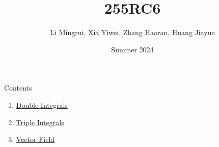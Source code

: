 \documentclass[aspectratio=169, UTF8]{ctexbeamer}
\title{\LARGE 255RC6}
\author{ Li Mingrui, Xia Yiwei, Zhang Haoran, Huang Jiayue}
\date{Summer 2024}
\begin{document}
\maketitle



\begin{frame}{Contents}
    \begin{enumerate}
        \item \hyperlink{1}{Double Integrals}
        \item \hyperlink{2}{Triple Integrals}
        \item \hyperlink{3}{Vector Field}
    \end{enumerate}
       
\end{frame}

    
\end{document}
